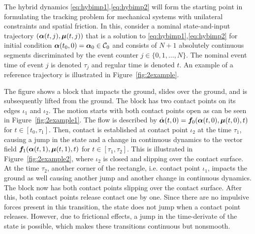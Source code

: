 \documentclass[../DC2017114Bouma.tex]{subfiles}
\begin{document}
The hybrid dynamics \eqref{eq:hybimp1},\eqref{eq:hybimp2} will form the starting point in formulating the tracking problem for mechanical systems with unilateral constraints and spatial friction. In this, consider a nominal state-and-input trajectory $(\boldsymbol{\alpha}(t,j),\boldsymbol{\mu}(t,j))$ that is a solution to \eqref{eq:hybimp1},\eqref{eq:hybimp2} for initial condition $\boldsymbol{\alpha}(t_0,0) = \boldsymbol{\alpha}_0\in \mathcal{C}_0$ and consists of $N+1$ absolutely continuous segments discriminated by the event counter $j\in\{0,1,\dots,N\}$. The nominal event time of event $j$ is denoted $\tau_j$ and regular time is denoted $t$. An example of a reference trajectory is illustrated in Figure~\ref{fig:2example}.

The figure shows a block that impacts the ground, slides over the ground, and is subsequently lifted from the ground. The block has two contact points on its edges $\iota_1$ and $\iota_2$. The motion starts with both contact points open as can be seen in Figure~\ref{fig:2example1}. The flow is described by $\dot{\boldsymbol{\alpha}}(t,0) = {\boldsymbol{f}}_0(\boldsymbol{\alpha}(t,0),\boldsymbol{\mu}(t,0),t)$ for $t\in[t_0,\tau_1]$. Then, contact is established at contact point $\iota_2$ at the time $\tau_1$, causing a jump in the state and a change in continuous dynamics to the vector field ${\boldsymbol{f}}_1(\boldsymbol{\alpha}(t,1),\boldsymbol{\mu}(t,1),t)$ for $t\in[\tau_1,\tau_2]$. This is illustrated in Figure~\ref{fig:2example2}, where $\iota_2$ is closed and slipping over the contact surface. At the time $\tau_2$, another corner of the rectangle, i.e. contact point $\iota_1$, impacts the ground as well causing another jump and another change in continuous dynamics. The block now has both contact points slipping over the contact surface. After this, both contact points release contact one by one. Since there are no impulsive forces present in this transition, the state does not jump when a contact point releases. However, due to frictional effects, a jump in the time-derivate of the state is possible, which makes these transitions continuous but nonsmooth.
\end{document}
